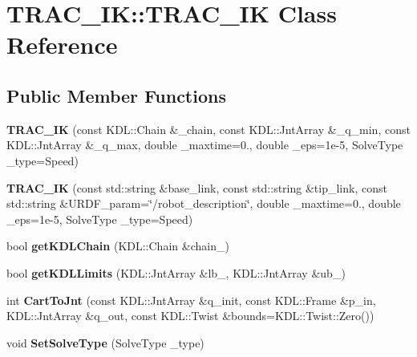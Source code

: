 \section{T\-R\-A\-C\-\_\-\-I\-K\-:\-:T\-R\-A\-C\-\_\-\-I\-K Class Reference}
\label{class_t_r_a_c___i_k_1_1_t_r_a_c___i_k}
\subsection*{Public Member Functions}
\begin{DoxyCompactItemize}
\item 
{\bfseries T\-R\-A\-C\-\_\-\-I\-K} (const K\-D\-L\-::\-Chain \&\-\_\-chain, const K\-D\-L\-::\-Jnt\-Array \&\-\_\-q\-\_\-min, const K\-D\-L\-::\-Jnt\-Array \&\-\_\-q\-\_\-max, double \-\_\-maxtime=0., double \-\_\-eps=1e-\/5, Solve\-Type \-\_\-type=\-Speed)\label{class_t_r_a_c___i_k_1_1_t_r_a_c___i_k_a65aa7452b9056ef45cdc1b4180620823}

\item 
{\bfseries T\-R\-A\-C\-\_\-\-I\-K} (const std\-::string \&base\-\_\-link, const std\-::string \&tip\-\_\-link, const std\-::string \&U\-R\-D\-F\-\_\-param=\char`\"{}/robot\-\_\-description\char`\"{}, double \-\_\-maxtime=0., double \-\_\-eps=1e-\/5, Solve\-Type \-\_\-type=\-Speed)\label{class_t_r_a_c___i_k_1_1_t_r_a_c___i_k_a18ca0ea66603bc72118cbef14969cca1}

\item 
bool {\bfseries get\-K\-D\-L\-Chain} (K\-D\-L\-::\-Chain \&chain\-\_\-)\label{class_t_r_a_c___i_k_1_1_t_r_a_c___i_k_acf36ae6b9773eed5992648f6d5912599}

\item 
bool {\bfseries get\-K\-D\-L\-Limits} (K\-D\-L\-::\-Jnt\-Array \&lb\-\_\-, K\-D\-L\-::\-Jnt\-Array \&ub\-\_\-)\label{class_t_r_a_c___i_k_1_1_t_r_a_c___i_k_afc911c3ec0270fa2420c208cb5aee2b5}

\item 
int {\bfseries Cart\-To\-Jnt} (const K\-D\-L\-::\-Jnt\-Array \&q\-\_\-init, const K\-D\-L\-::\-Frame \&p\-\_\-in, K\-D\-L\-::\-Jnt\-Array \&q\-\_\-out, const K\-D\-L\-::\-Twist \&bounds=K\-D\-L\-::\-Twist\-::\-Zero())\label{class_t_r_a_c___i_k_1_1_t_r_a_c___i_k_af093d155f2d79105c6ec62c02cf47e1a}

\item 
void {\bfseries Set\-Solve\-Type} (Solve\-Type \-\_\-type)\label{class_t_r_a_c___i_k_1_1_t_r_a_c___i_k_a32120c7560aadc3171dc290a640737fa}

\end{DoxyCompactItemize}
